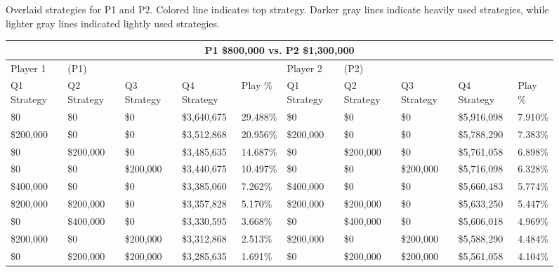 \documentclass[11pt]{article}
\begin{document}
\begin{figure}
{
}
\caption{Overlaid strategies for P1 and P2. Colored line indicates top strategy. Darker gray lines indicate heavily used strategies, while lighter gray lines indicated lightly used strategies.}
\label{8v12.2}
\end{figure}

\begin{figure}
\tiny
\begin{tabular}{ |p{1.0cm}p{1.0cm}p{1.0cm}p{2.0cm}|p{1.0cm}||p{1.0cm}p{1.0cm}p{1.0cm}p{2.0cm}|p{1.0cm}|}
\hline
\multicolumn{10}{|c|}{P1 \$800,000 vs. P2 \$1,300,000} \\
\hline
Player 1 & (P1) & & & & Player 2 & (P2) & & & \\
\hline
Q1 Strategy & Q2 Strategy & Q3 Strategy & Q4 Strategy  &  Play \% & Q1 Strategy & Q2 Strategy & Q3 Strategy & Q4 Strategy  &  Play \%\\
\hline
\$0 & \$0 & \$0 & \$3,640,675  & 29.488\%           & \$0 & \$0 & \$0 & \$5,916,098  & 7.910\% \\
\$200,000 & \$0 & \$0 & \$3,512,868  & 20.956\%     & \$200,000 & \$0 & \$0 & \$5,788,290  & 7.383\% \\
\$0& \$200,000 & \$0 & \$3,485,635  & 14.687\%      & \$0& \$200,000 & \$0 & \$5,761,058  & 6.898\% \\
\$0 & \$0& \$200,000 & \$3,440,675  & 10.497\%      & \$0 & \$0& \$200,000 & \$5,716,098  & 6.328\% \\
\$400,000 & \$0 & \$0 & \$3,385,060  & 7.262\%      & \$400,000 & \$0 & \$0 & \$5,660,483  & 5.774\% \\
\$200,000& \$200,000 & \$0 & \$3,357,828  & 5.170\% & \$200,000& \$200,000 & \$0 & \$5,633,250  & 5.447\% \\
\$0& \$400,000 & \$0 & \$3,330,595  & 3.668\%       & \$0& \$400,000 & \$0 & \$5,606,018  & 4.969\% \\
\$200,000 & \$0& \$200,000 & \$3,312,868  & 2.513\% & \$200,000 & \$0& \$200,000 & \$5,588,290  & 4.484\% \\
\$0& \$200,000& \$200,000 & \$3,285,635  & 1.691\%  & \$0& \$200,000& \$200,000 & \$5,561,058  & 4.104\% \\

\end{tabular}
\end{figure}
\end{document}
